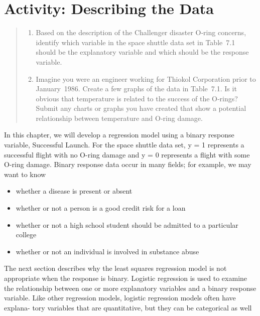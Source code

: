\documentclass[
]{report}
\providecommand{\tightlist}{%
  \setlength{\itemsep}{0pt}\setlength{\parskip}{0pt}}
\begin{document}
\section*{Activity: Describing the Data}\label{activity-describing-the-data-1}

\begin{quote}
\begin{enumerate}
\def\labelenumi{\arabic{enumi}.}
\tightlist
\item
  Based on the description of the Challenger disaster O‑ring concerns, identify which variable in the space shuttle data set in Table~7.1 should be the explanatory variable and which should be the response variable.\\
\item
  Imagine you were an engineer working for Thiokol Corporation prior to January~1986. Create a few graphs of the data in Table~7.1. Is it obvious that temperature is related to the success of the O‑rings? Submit any charts or graphs you have created that show a potential relationship between temperature and O‑ring damage.
\end{enumerate}
\end{quote}

In this chapter, we will develop a regression model using a binary response variable, Successful Launch. For
the space shuttle data set, y = 1 represents a successful flight with no O-ring damage and y = 0 represents a
flight with some O-ring damage. Binary response data occur in many fields; for example, we may want to know

\begin{itemize}
\tightlist
\item
  whether a disease is present or absent
\item
  whether or not a person is a good credit risk for a loan
\item
  whether or not a high school student should be admitted to a particular college
\item
  whether or not an individual is involved in substance abuse
\end{itemize}

The next section describes why the least squares regression model is not appropriate when the response is
binary. Logistic regression is used to examine the relationship between one or more explanatory variables
and a binary response variable. Like other regression models, logistic regression models often have explana-
tory variables that are quantitative, but they can be categorical as well
\end{document}
